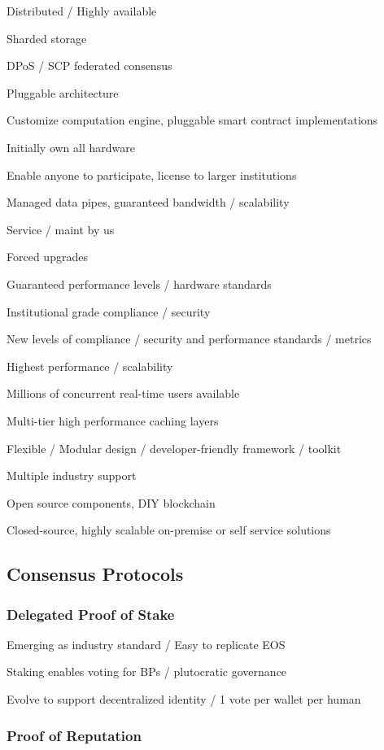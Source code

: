 \documentclass[11pt]{article}
\begin{document}
Distributed / Highly available


Sharded storage


DPoS / SCP federated consensus


Pluggable architecture


Customize computation engine, pluggable smart contract implementations


Initially own all hardware


Enable anyone to participate, license to larger institutions


Managed data pipes, guaranteed bandwidth / scalability


Service / maint by us


Forced upgrades


Guaranteed performance levels / hardware standards


Institutional grade compliance / security


New levels of compliance / security and performance standards / metrics


Highest performance / scalability


Millions of concurrent real-time users available


Multi-tier high performance caching layers


Flexible / Modular design / developer-friendly framework / toolkit


Multiple industry support


Open source components, DIY blockchain


Closed-source, highly scalable on-premise or self service solutions


\subsection{Consensus Protocols}

\subsubsection{Delegated Proof of Stake}

Emerging as industry standard / Easy to replicate EOS


Staking enables voting for BPs / plutocratic governance


Evolve to support decentralized identity / 1 vote per wallet per human


\subsubsection{Proof of Reputation}
\end{document}

